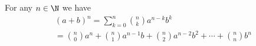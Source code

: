 \begin{thm}
For any $n \in \N$ we have
\begin{multline*}
(a+b)^n = \sum_{k=0}^n \binom{n}{k} a^{n-k}b^k\\
= \binom{n}{0}a^n + \binom{n}{1}a^{n-1}b + \binom{n}{2}a^{n-2}b^2 + \cdots + \binom{n}{n}b^n
\end{multline*}
\end{thm}